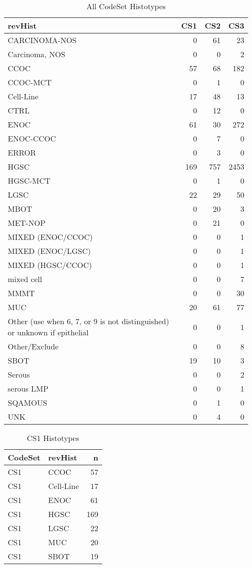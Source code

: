 \documentclass[
]{report}
\begin{document}
\begin{table}

\caption{\label{tab:dist-all}All CodeSet Histotypes}
\centering
\begin{tabular}[t]{l|r|r|r}
\hline
revHist & CS1 & CS2 & CS3\\
\hline
CARCINOMA-NOS & 0 & 61 & 23\\
\hline
Carcinoma, NOS & 0 & 0 & 2\\
\hline
CCOC & 57 & 68 & 182\\
\hline
CCOC-MCT & 0 & 1 & 0\\
\hline
Cell-Line & 17 & 48 & 13\\
\hline
CTRL & 0 & 12 & 0\\
\hline
ENOC & 61 & 30 & 272\\
\hline
ENOC-CCOC & 0 & 7 & 0\\
\hline
ERROR & 0 & 3 & 0\\
\hline
HGSC & 169 & 757 & 2453\\
\hline
HGSC-MCT & 0 & 1 & 0\\
\hline
LGSC & 22 & 29 & 50\\
\hline
MBOT & 0 & 20 & 3\\
\hline
MET-NOP & 0 & 21 & 0\\
\hline
MIXED (ENOC/CCOC) & 0 & 0 & 1\\
\hline
MIXED (ENOC/LGSC) & 0 & 0 & 1\\
\hline
MIXED (HGSC/CCOC) & 0 & 0 & 1\\
\hline
mixed cell & 0 & 0 & 7\\
\hline
MMMT & 0 & 0 & 30\\
\hline
MUC & 20 & 61 & 77\\
\hline
Other (use when 6, 7, or 9 is not distinguished) or unknown if epithelial & 0 & 0 & 1\\
\hline
Other/Exclude & 0 & 0 & 8\\
\hline
SBOT & 19 & 10 & 3\\
\hline
Serous & 0 & 0 & 2\\
\hline
serous LMP & 0 & 0 & 1\\
\hline
SQAMOUS & 0 & 1 & 0\\
\hline
UNK & 0 & 4 & 0\\
\hline
\end{tabular}
\end{table}

\begin{table}

\caption{\label{tab:dist-cs1}CS1 Histotypes}
\centering
\begin{tabular}[t]{l|l|r}
\hline
CodeSet & revHist & n\\
\hline
CS1 & CCOC & 57\\
\hline
CS1 & Cell-Line & 17\\
\hline
CS1 & ENOC & 61\\
\hline
CS1 & HGSC & 169\\
\hline
CS1 & LGSC & 22\\
\hline
CS1 & MUC & 20\\
\hline
CS1 & SBOT & 19\\
\hline
\end{tabular}
\end{table}
\end{document}
